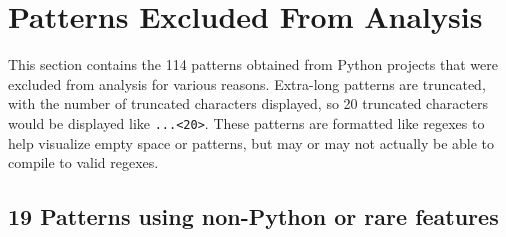 \section*{Patterns Excluded From Analysis}
\label{app:excludedPatterns}

This section contains the 114 patterns obtained from Python projects that were excluded from analysis for various reasons.  Extra-long patterns are truncated, with the number of truncated characters displayed, so 20 truncated characters would be displayed like \verb!...<20>!.  These patterns are formatted like regexes to help visualize empty space or patterns, but may or may not actually be able to compile to valid regexes.

\subsection*{19 Patterns using non-Python or rare features}
